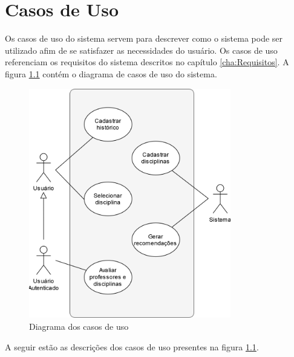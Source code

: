 

\chapter{Casos de Uso}
\label{cha:Casos de Uso}

Os casos de uso do sistema servem para descrever como o sistema pode ser utilizado afim de se satisfazer as necessidades do usuário.
Os casos de uso referenciam os requisitos do sistema descritos no capítulo \ref{cha:Requisitos}.
A figura \ref{fig:diagrama-casos-uso} contém o diagrama de casos de uso do sistema.

\begin{figure}[ht]
    \begin{center}
    \includegraphics[width=250pt]{figuras/casos-uso.png}
    \caption{Diagrama dos casos de uso}
    \label{fig:diagrama-casos-uso}
    \end{center}
\end{figure}

A seguir estão as descrições dos casos de uso presentes na figura \ref{fig:diagrama-casos-uso}.


